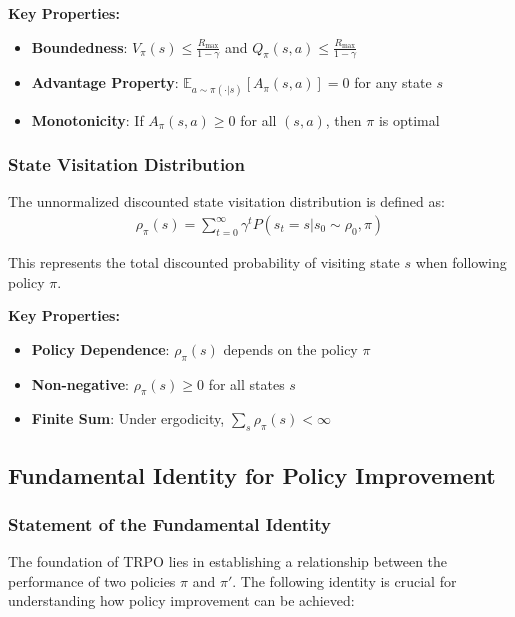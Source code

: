\textbf{Key Properties:}
\begin{itemize}
    \item \textbf{Boundedness}: $V_\pi(s) \leq \frac{R_{\max}}{1-\gamma}$ and $Q_\pi(s,a) \leq \frac{R_{\max}}{1-\gamma}$
    \item \textbf{Advantage Property}: $\mathbb{E}_{a \sim \pi(\cdot|s)}[A_\pi(s,a)] = 0$ for any state $s$
    \item \textbf{Monotonicity}: If $A_\pi(s,a) \geq 0$ for all $(s,a)$, then $\pi$ is optimal
\end{itemize}

\subsubsection{State Visitation Distribution}

The unnormalized discounted state visitation distribution is defined as:
\begin{align*}
    \rho_\pi(s) = \sum_{t=0}^{\infty} \gamma^t P(s_t = s | s_0 \sim \rho_0, \pi)
\end{align*}

This represents the total discounted probability of visiting state $s$ when following policy $\pi$.

\textbf{Key Properties:}
\begin{itemize}
    \item \textbf{Policy Dependence}: $\rho_\pi(s)$ depends on the policy $\pi$
    \item \textbf{Non-negative}: $\rho_\pi(s) \geq 0$ for all states $s$
    \item \textbf{Finite Sum}: Under ergodicity, $\sum_s \rho_\pi(s) < \infty$
\end{itemize}


\subsection{Fundamental Identity for Policy Improvement}

\subsubsection{Statement of the Fundamental Identity}

The foundation of TRPO lies in establishing a relationship between the performance of two policies $\pi$ and $\pi'$. The following identity is crucial for understanding how policy improvement can be achieved:

